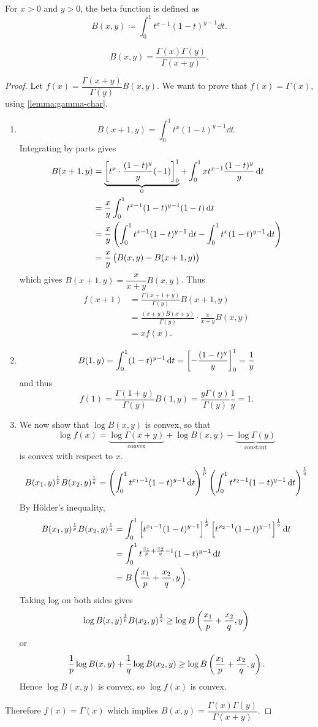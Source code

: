 \begin{definition}
For $x>0$ and $y>0$, the beta function is defined as
\[B(x,y)\coloneqq\int_0^1 t^{x-1}(1-t)^{y-1}\dd{t}.\]
\end{definition}

\begin{lemma}
\[B(x,y)=\frac{\Gamma(x)\Gamma(y)}{\Gamma(x+y)}.\]
\end{lemma}

\begin{proof}
Let $f(x)=\dfrac{\Gamma(x+y)}{\Gamma(y)}B(x,y)$. We want to prove that $f(x)=\Gamma(x)$, using \cref{lemma:gamma-char}.
\begin{enumerate}[label=(\arabic*)]
\item \[B(x+1,y)=\int_0^1 t^x(1-t)^{y-1}\dd{t}.\]
Integrating by parts gives
\begin{align*}
B(x+1,y)&=\underbrace{\left[t^x\cdot\frac{(1-t)^y}{y}(-1)\right]_0^1}_{0}+\int_0^1 xt^{x-1}\frac{(1-t)^y}{y}\dd{t}\\
&=\frac{x}{y}\int_0^1 t^{x-1}(1-t)^{y-1}(1-t)\dd{t}\\
&=\frac{x}{y}\left(\int_0^1 t^{x-1}(1-t)^{y-1}\dd{t}-\int_0^1 t^x(1-t)^{y-1}\dd{t}\right)\\
&=\frac{x}{y}\left(B(x,y)-B(x+1,y)\right)
\end{align*}
which gives $B(x+1,y)=\dfrac{x}{x+y}B(x,y)$. Thus
\begin{align*}
f(x+1)&=\frac{\Gamma(x+1+y)}{\Gamma(y)}B(x+1,y)\\
&=\frac{(x+y)B(x+y)}{\Gamma(y)}\cdot\frac{x}{x+y}B(x,y)\\
&=xf(x).
\end{align*}
\item \[B(1,y)=\int_0^1(1-t)^{y-1}\dd{t}=\left[-\frac{(1-t)^y}{y}\right]_0^1=\frac{1}{y}\]
and thus
\[f(1)=\frac{\Gamma(1+y)}{\Gamma(y)}B(1,y)=\frac{y\Gamma(y)}{\Gamma(y)}\frac{1}{y}=1.\]
\item We now show that $\log B(x,y)$ is convex, so that
\[\log f(x)=\underbrace{\log\Gamma(x+y)}_\text{convex}+\log B(x,y)-\underbrace{\log\Gamma(y)}_\text{constant}\]
is convex with respect to $x$.
\[B(x_1,y)^\frac{1}{p}B(x_2,y)^\frac{1}{q}=\left(\int_0^1 t^{x_1-1}(1-t)^{y-1}\dd{t}\right)^\frac{1}{p}\left(\int_0^1 t^{x_2-1}(1-t)^{y-1}\dd{t}\right)^\frac{1}{q}\]
By H\"{o}lder's inequality,
\begin{align*}
B(x_1,y)^\frac{1}{p}B(x_2,y)^\frac{1}{q}
&=\int_0^1\left[t^{x_1-1}(1-t)^{y-1}\right]^\frac{1}{p}\left[t^{x_2-1}(1-t)^{y-1}\right]^\frac{1}{q}\dd{t}\\
&=\int_0^1 t^{\frac{x_1}{p}+\frac{x_2}{q}-1}(1-t)^{y-1}\dd{t}\\
&=B\left(\frac{x_1}{p}+\frac{x_2}{q},y\right).
\end{align*}
Taking log on both sides gives
\[\log B(x,y)^\frac{1}{p}B(x_2,y)^\frac{1}{q}\ge\log B\left(\frac{x_1}{p}+\frac{x_2}{q},y\right)\]
or
\[\frac{1}{p}\log B(x,y)+\frac{1}{q}\log B(x_2,y)\ge\log B\left(\frac{x_1}{p}+\frac{x_2}{q},y\right).\]
Hence $\log B(x,y)$ is convex, so $\log f(x)$ is convex.
\end{enumerate}
Therefore $f(x)=\Gamma(x)$ which implies $B(x,y)=\dfrac{\Gamma(x)\Gamma(y)}{\Gamma(x+y)}$.
\end{proof}

